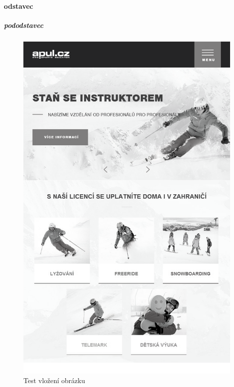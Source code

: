 \documentclass[FM,DP]{tulthesis}
\begin{document}
\paragraph{odstavec}

\subparagraph{pododstavec}


\begin{figure}[ht]
\centering
\includegraphics[scale=0.15]{images/text/01.jpg}
\caption{Test vložení obrázku}
\label{foto}
\end{figure}








\end{document}
